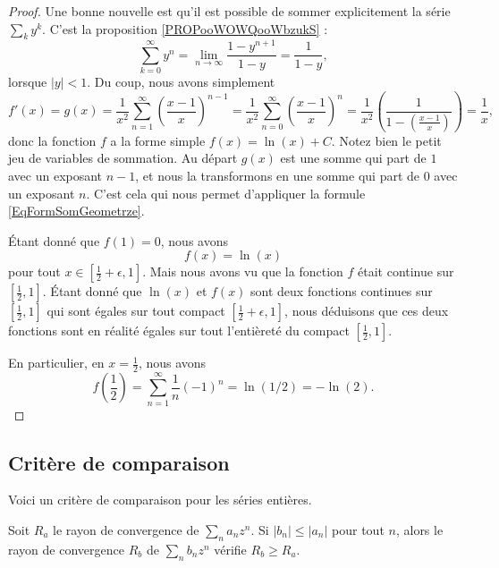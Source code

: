 \begin{proof}
	Une bonne nouvelle est qu'il est possible de sommer explicitement la série \( \sum_ky^k\). C'est la proposition \ref{PROPooWOWQooWbzukS} :
	\begin{equation}		\label{EqFormSomGeometrze}
		\sum_{k=0}^{\infty}y^n=\lim_{n\to\infty}\frac{1-y^{n+1}}{ 1-y }=\frac{1}{ 1-y },
	\end{equation}
	lorsque \( | y |<1\). Du coup, nous avons simplement
	\begin{equation}
		f'(x)=g(x)=\frac{1}{ x^2 }\sum_{n=1}^{\infty}\left( \frac{ x-1 }{ x } \right)^{n-1}=\frac{1}{ x^2 }\sum_{n=0}^{\infty}\left( \frac{ x-1 }{ x } \right)^n=\frac{1}{ x^2 }\left( \frac{1}{  1-\left( \frac{ x-1 }{ x } \right)  } \right)=\frac{1}{ x },
	\end{equation}
	donc la fonction \( f\) a la forme simple \( f(x)=\ln(x)+C\). Notez bien le petit jeu de variables de sommation. Au départ \( g(x)\) est une somme qui part de \( 1\) avec un exposant \( n-1\), et nous la transformons en une somme qui part de \( 0\) avec un exposant \( n\). C'est cela qui nous permet d'appliquer la formule \eqref{EqFormSomGeometrze}.

	Étant donné que \( f(1)=0\), nous avons
	\begin{equation}
		f(x)=\ln(x)
	\end{equation}
	pour tout \( x\in[\frac{ 1 }{2}+\epsilon,1]\). Mais nous avons vu que la fonction \( f\) était continue sur \( [\frac{ 1 }{2},1]\). Étant donné que \( \ln(x)\) et \( f(x)\) sont deux fonctions continues sur \( [\frac{ 1 }{2},1]\) qui sont égales sur tout compact \( [\frac{ 1 }{2}+\epsilon,1]\), nous déduisons que ces deux fonctions sont en réalité égales sur tout l'entièreté du compact \( [\frac{ 1 }{2},1]\).

	En particulier, en \( x=\frac{ 1 }{2}\), nous avons
	\begin{equation}
		f(\frac{ 1 }{2})=\sum_{n=1}^{\infty}\frac{1}{ n }(-1)^n=\ln(1/2)=-\ln(2).
	\end{equation}
\end{proof}


\subsection{Critère de comparaison}

Voici un critère de comparaison pour les séries entières.

\begin{proposition}	\label{PROPooJCQTooBlinDm}
	Soit \( R_a\) le rayon de convergence de \( \sum_na_nz^n\). Si \( | b_n |\leq | a_n |\) pour tout \( n\), alors le rayon de convergence \( R_b\) de \( \sum_nb_nz^n\) vérifie \( R_b\geq R_a\).
\end{proposition}

